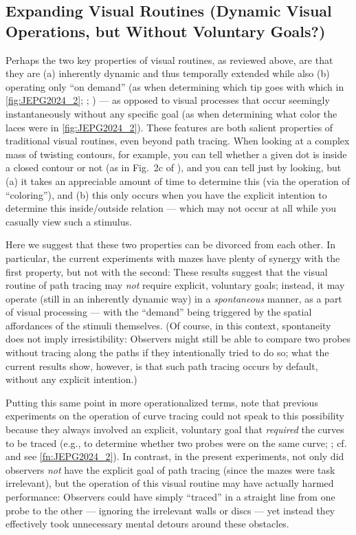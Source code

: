 \subsection[Expanding Visual Routines]{Expanding Visual Routines (Dynamic Visual Operations, but Without Voluntary Goals?)}
Perhaps the two key properties of visual routines, as reviewed above, are that they are (a) inherently dynamic and thus temporally extended while also (b) operating only “on demand” (as when determining which tip goes with which in \cref{fig:JEPG2024_2}; \cite{ullman_visual_1984}; \cite{ullman_chapter_1996}) --- as opposed to visual processes that occur seemingly instantaneously without any specific goal (as when determining what color the laces were in \cref{fig:JEPG2024_2}). These features are both salient properties of traditional visual routines, even beyond path tracing. When looking at a complex mass of twisting contours, for example, you can tell whether a given dot is inside a closed contour or not (as in Fig.~2c of \cite{ullman_visual_1984}), and you can tell just by looking, but (a) it takes an appreciable amount of time to determine this (via the operation of “coloring”), and (b) this only occurs when you have the explicit intention to determine this inside/outside relation --- which may not occur at all while you casually view such a stimulus.

Here we suggest that these two properties can be divorced from each other. In particular, the current experiments with mazes have plenty of synergy with the first property, but not with the second: These results suggest that the visual routine of path tracing may \textit{not} require explicit, voluntary goals; instead, it may operate (still in an inherently dynamic way) in a \textit{spontaneous} manner, as a part of visual processing --- with the “demand” being triggered by the spatial affordances of the stimuli themselves. (Of course, in this context, spontaneity does not imply irresistibility: Observers might still be able to compare two probes without tracing along the paths if they intentionally tried to do so; what the current results show, however, is that such path tracing occurs by default, without any explicit intention.)

Putting this same point in more operationalized terms, note that previous experiments on the operation of curve tracing could not speak to this possibility because they always involved an explicit, voluntary goal that \textit{required} the curves to be traced (e.g., to determine whether two probes were on the same curve; \cite{jolicoeur_curve_1986,jolicoeur_visual_1991, mccormick_capturing_1992}; cf.~\cite{pringle_mental_1988} and see \cref{fn:JEPG2024_2}). In contrast, in the present experiments, not only did observers \textit{not} have the explicit goal of path tracing (since the mazes were task irrelevant), but the operation of this visual routine may have actually harmed performance: Observers could have simply “traced” in a straight line from one probe to the other --- ignoring the irrelevant walls or discs --- yet instead they effectively took unnecessary mental detours around these obstacles.

